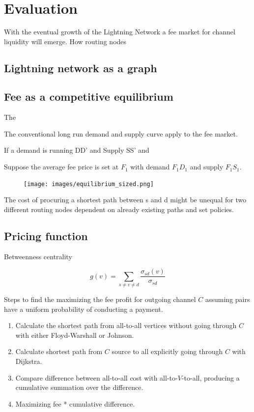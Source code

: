 \chapter{Evaluation}

With the eventual growth of the Lightning Network a fee market for channel liquidity will emerge. How routing nodes 

\section{Lightning network as a graph}




\section{Fee as a competitive equilibrium}

The

The conventional long run demand and supply curve apply to the fee market.

If a demand is running DD' and Supply SS' and

Suppose the average fee price is set at $F_{1}$ with demand $F_{1}D_{1}$ and supply $F_{1}S_{1}$.

\begin{figure}[!htb]
	\hspace*{-0.7cm} 
	\centering
	\texttt{[image: images/equilibrium\_sized.png]}
	\caption{ 
		}
		\label{fig:equilibrium}
		\hspace*{2mm} 	
\end{figure}



The cost of procuring a shortest path between s and d might be unequal for two different routing nodes dependent on already existing paths and set policies.

\section{Pricing function}

Betweenness centrality

\[ g(v) = \sum_{s \neq v \neq d}\frac{\sigma_{sd}(v)}{\sigma_{sd}} \]

Steps to find the maximizing the fee profit for outgoing channel $C$ assuming pairs have a uniform probability of conducting a payment.

\begin{enumerate}
	\item Calculate the shortest path from all-to-all vertices without going through $C$ with either Floyd-Warshall or Johnson. 
	\item Calculate shortest path from $C$ source to all explicitly going through $C$ with Dijkstra.
	\item Compare difference between all-to-all cost with all-to-$V$-to-all, producing a cumulative summation over the difference.
	\item Maximizing fee * cumulative difference.
\end{enumerate} 


